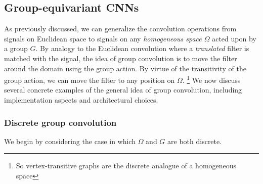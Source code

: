 \documentclass[12pt]{article}
\numberwithin{equation}{section}
\theoremstyle{definition}
\newcommand{		\Oh		}	{	\Omega					}
\newcommand{		\1		}	{	\bm{1}					}%
\begin{document}
\subsection{Group-equivariant CNNs}  

As previously discussed, we can generalize the convolution operations from signals on Euclidean space to signals on any \emph{homogeneous space $\Oh$} acted upon by a group $G$. By analogy to the Euclidean convolution where a \emph{translated} filter is matched with the signal, the idea of group convolution is to move the filter around the domain using the group action. By virtue of the transitivity of the group action, we can move the filter to any position on $\Oh$. \footnote{ So vertex-transitive graphs are the discrete analogue of a homogeneous space } We now discuss several concrete examples of the general idea of group convolution, including implementation aspects and architectural choices. 

\subsubsection*{Discrete group convolution} 

We begin by considering the case in which $\Oh$ and $G$ are both discrete. 
\end{document}
